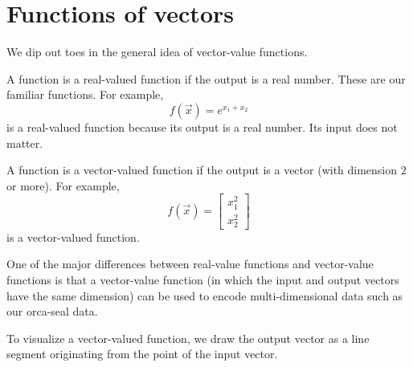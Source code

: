 \documentclass[../main.tex]{subfiles}
\begin{document}
 \section{Functions of vectors}

We dip out toes in the general idea of vector-value functions. 

A function is a real-valued function if the output is a real number. These are our familiar functions.  For example, 
\[
  f(\vec{x}) = e^{x_{1} + x_{2}}
\]
is a real-valued function because its output is a real number. Its input does not matter. 

A function is a vector-valued function if the output is a vector (with dimension \(2\) or more). For example, 
\[
  f(\vec{x}) = 
  \begin{bmatrix}
    x_{1}^{2} \\
    x_{2}^{2}
  \end{bmatrix}
\]
is a vector-valued function. 

One of the major differences between real-value functions and vector-value functions is that a vector-value function (in which the input and output vectors have the same dimension) can be used to encode multi-dimensional data such as our orca-seal data.

To visualize a vector-valued function, we draw the output vector as a line segment originating from the point of the input vector.
\end{document}
